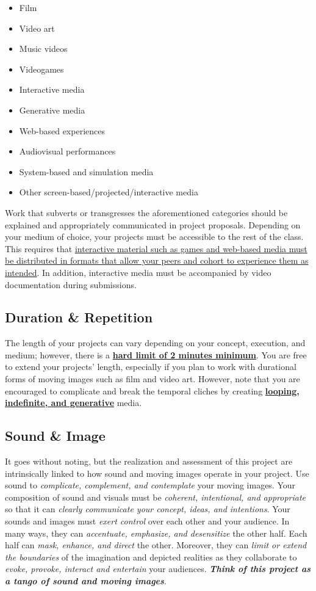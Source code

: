 \begin{itemize}
    \tightlist
    \item Film
    \item Video art
    \item Music videos
    \item Videogames
    \item Interactive media
    \item Generative media
    \item Web-based experiences
    \item Audiovisual performances
    \item System-based and simulation media
    \item Other screen-based/projected/interactive media
\end{itemize}


Work that subverts or transgresses the aforementioned categories should be explained and appropriately communicated in project proposals. Depending on your medium of choice, your projects must be accessible to the rest of the class. This requires that \ul{interactive material such as games and web-based media must be distributed in formats that allow your peers and cohort to experience them as intended}. In addition, interactive media must be accompanied by video documentation during submissions.


\hypertarget{projduration}{\subsection{Duration \& Repetition}}


The length of your projects can vary depending on your concept, execution, and medium; however, there is a \ul{\textbf{hard limit of 2 minutes minimum}}. You are free to extend your projects' length, especially if you plan to work with durational forms of moving images such as film and video art. However, note that you are encouraged to complicate and break the temporal cliches by creating \ul{\textbf{looping, indefinite, and generative}} media.

\hypertarget{projstyle}{\subsection{Sound \& Image}}

It goes  without noting, but the realization and assessment of this project are intrinsically linked to how sound and moving images operate in your project. Use sound to \emph{complicate, complement, and contemplate} your moving images. Your composition of sound and visuals must be \emph{coherent, intentional, and appropriate} so that it can \emph{clearly communicate your concept, ideas, and intentions}. Your sounds and images must \emph{exert control} over each other and your audience. In many ways, they can \emph{accentuate, emphasize, and desensitize} the other half. Each half can \emph{mask, enhance, and direct} the other. Moreover, they can \emph{limit or extend the boundaries} of the imagination and depicted realities as they collaborate to \emph{evoke, provoke, interact and entertain} your audiences. \textbf{\emph{Think of this project as a tango of sound and moving images}}.

